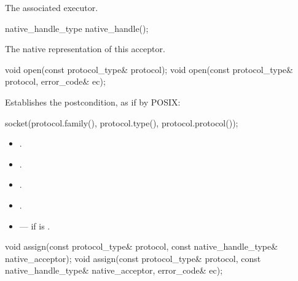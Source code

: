 \begin{itemdescr}
\pnum
\returns The associated executor.
\end{itemdescr}

\begin{itemdecl}
native_handle_type native_handle();
\end{itemdecl}

\begin{itemdescr}
\pnum
\returns The native representation of this acceptor.
\end{itemdescr}

\begin{itemdecl}
void open(const protocol_type& protocol);
void open(const protocol_type& protocol, error_code& ec);
\end{itemdecl}

\begin{itemdescr}
\pnum
\effects Establishes the postcondition, as if by POSIX:
\begin{codeblock}
socket(protocol.family(), protocol.type(), protocol.protocol());
\end{codeblock}

\pnum
\postconditions
\begin{itemize}
\item
{}.
\item
{}.
\item
{}.
\item
{}.
\end{itemize}

\pnum
\errors
\begin{itemize}
\item
{} --- if  is .
\end{itemize}
\end{itemdescr}

\begin{itemdecl}
void assign(const protocol_type& protocol,
            const native_handle_type& native_acceptor);
void assign(const protocol_type& protocol,
            const native_handle_type& native_acceptor, error_code& ec);
\end{itemdecl}

